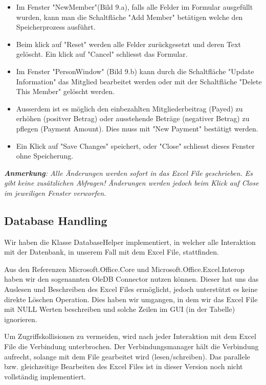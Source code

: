 \documentclass{article}
\begin{document}
 	\begin{itemize}
 	
	\item Im Fenster "NewMember"(Bild 9.a), falls alle Felder im Formular ausgefüllt wurden, kann man die Schaltfläche "Add Member" betätigen welche den Speicherprozess ausführt.
	\item Beim klick auf "Reset" werden alle Felder zurückgesetzt und deren Text gelöscht. Ein klick auf "Cancel" schliesst das Formular.
	
	\vspace{5mm}
	
	 \item Im Fenster "PersonWindow" (Bild 9.b) kann durch die Schaltfläche "Update Information" das Mitglied bearbeitet werden 				oder mit der Schaltfläche "Delete This Member" gelöscht werden.
 \item Ausserdem ist es möglich den einbezahlten Mitgliederbeitrag (Payed) zu erhöhen (positver Betrag) oder ausstehende Beträge (negativer Betrag) zu pflegen (Payment Amount). Dies muss mit "New Payment" bestätigt werden.
 \item Ein Klick auf "Save Changes" speichert, oder "Close" schliesst dieses Fenster ohne Speicherung.
 	\end{itemize} 


\vspace{5mm}
\textit{\textbf{Anmerkung}: Alle Änderungen werden sofort in das Excel File geschrieben. Es gibt keine zusätzlichen Abfragen! Änderungen werden jedoch beim Klick auf Close im jeweiligen Fenster verworfen.}

\subsection{Database Handling}
Wir haben die Klasse DatabaseHelper implementiert, in welcher alle Interaktion mit der Datenbank, in unserem Fall mit dem Excel File, stattfinden.

Aus den Referenzen Microsoft.Office.Core und Microsoft.Office.Excel.Interop haben wir den sogenannten OleDB Connector nutzen können. Dieser hat uns das Auslesen und Beschreiben des Excel Files ermöglicht, jedoch unterstützt es keine direkte Löschen Operation. Dies haben wir umgangen, in dem wir das Excel File mit NULL Werten beschreiben und solche Zeilen im GUI (in der Tabelle) ignorieren.

Um Zugriffskollisionen zu vermeiden, wird nach jeder Interaktion mit dem Excel File die Verbindung unterbrochen. Der Verbindungsmanager hält die Verbindung aufrecht, solange mit dem File gearbeitet wird (lesen/schreiben).
Das parallele bzw. gleichzeitige Bearbeiten des Excel Files ist in dieser Version noch nicht vollständig implementiert.
\end{document}
